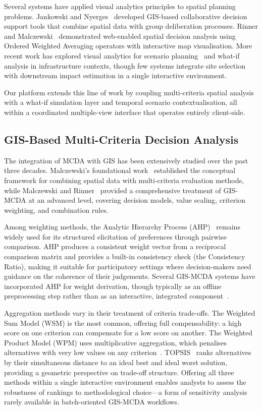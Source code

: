 Several systems have applied visual analytics principles to spatial planning problems. Jankowski and Nyerges~\cite{jankowski2001gis} developed GIS-based collaborative decision support tools that combine spatial data with group deliberation processes. Rinner and Malczewski~\cite{rinner2002owa} demonstrated web-enabled spatial decision analysis using Ordered Weighted Averaging operators with interactive map visualisation. More recent work has explored visual analytics for scenario planning~\cite{andrienko2003exploratory} and what-if analysis in infrastructure contexts, though few systems integrate site selection with downstream impact estimation in a single interactive environment.

Our platform extends this line of work by coupling multi-criteria spatial analysis with a what-if simulation layer and temporal scenario contextualisation, all within a coordinated multiple-view interface that operates entirely client-side.

\subsection{GIS-Based Multi-Criteria Decision Analysis}
\label{sec:rw-mcda}

The integration of MCDA with GIS has been extensively studied over the past three decades. Malczewski's foundational work~\cite{malczewski1999gis} established the conceptual framework for combining spatial data with multi-criteria evaluation methods, while Malczewski and Rinner~\cite{malczewski2015gismcda} provided a comprehensive treatment of GIS-MCDA at an advanced level, covering decision models, value scaling, criterion weighting, and combination rules.

Among weighting methods, the Analytic Hierarchy Process (AHP)~\cite{saaty1980ahp} remains widely used for its structured elicitation of preferences through pairwise comparison. AHP produces a consistent weight vector from a reciprocal comparison matrix and provides a built-in consistency check (the Consistency Ratio), making it suitable for participatory settings where decision-makers need guidance on the coherence of their judgements. Several GIS-MCDA systems have incorporated AHP for weight derivation, though typically as an offline preprocessing step rather than as an interactive, integrated component~\cite{priefer2022evcs,kaya2020evcs}.

Aggregation methods vary in their treatment of criteria trade-offs. The Weighted Sum Model (WSM) is the most common, offering full compensability: a high score on one criterion can compensate for a low score on another. The Weighted Product Model (WPM) uses multiplicative aggregation, which penalises alternatives with very low values on any criterion~\cite{malczewski2015gismcda}. TOPSIS~\cite{hwang1981topsis} ranks alternatives by their simultaneous distance to an ideal best and ideal worst solution, providing a geometric perspective on trade-off structure. Offering all three methods within a single interactive environment enables analysts to assess the robustness of rankings to methodological choice---a form of sensitivity analysis rarely available in batch-oriented GIS-MCDA workflows.

